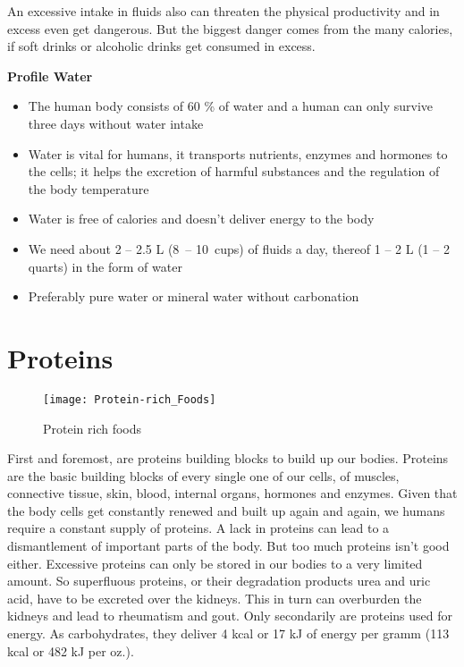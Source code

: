 \documentclass[../main.tex]{subfiles}
\begin{document}
    An excessive intake in fluids also can threaten the physical productivity and in excess even get dangerous.
    But the biggest danger comes from the many calories, if soft drinks or alcoholic drinks get consumed in excess. 

 
\vspace{5mm}
\noindent
\begin{fminipage}{\textwidth}
  \textbf{Profile Water}
  \begin{itemize}
  \item The human body consists of 60 \% of water and a human can only survive three days without water intake
  \item Water is vital for humans, it transports nutrients, enzymes and hormones to the cells; it helps the excretion of harmful substances and the regulation of the body temperature
  \item Water is free of calories and doesn't deliver energy to the body
  \item We need about 2 -- 2.5 L (8\ -- 10\ cups) of fluids a day, thereof 1 -- 2 L (1 -- 2 quarts) in the form of water
    \item Preferably pure water or mineral water without carbonation
  \end{itemize}
\end{fminipage}

\section{Proteins}

\begin{figure}[htb!]
\centering
  \texttt{[image: Protein-rich\_Foods]}
  \caption{Protein rich foods\cite{Proteins}}
\end{figure}

First and foremost, are proteins building blocks to build up our bodies.
Proteins are the basic building blocks of every single one of our cells, of muscles, connective tissue, skin,
blood, internal organs, hormones and enzymes.
Given that the body cells get constantly renewed and built up again and again, we humans require a constant supply of proteins.
A lack in proteins can lead to a dismantlement of important parts of the body.
But too much proteins isn't good either.
Excessive proteins can only be stored in our bodies to a very limited amount.
So superfluous proteins, or their degradation products urea and uric acid, have to be excreted over the kidneys.
This in turn can overburden the kidneys and lead to rheumatism and gout.
Only secondarily are proteins used for energy.
As carbohydrates, they deliver 4 kcal or 17 kJ of energy per gramm (113 kcal or 482 kJ per oz.).
\end{document}
